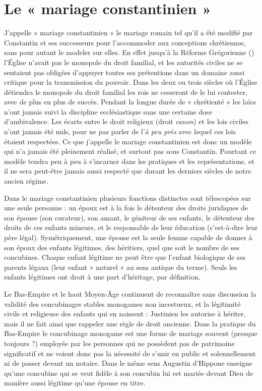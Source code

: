 
\chapter{Le « mariage constantinien »}


 J'appelle « mariage constantinien » le mariage romain tel qu'il a été modifié par Constantin et ses successeurs pour l'accommoder aux conceptions chrétiennes, sans pour autant le modeler sur elles. En effet jusqu'à la Réforme Grégorienne () l'Église n'avait pas le monopole du droit familial, et les autorités civiles ne se sentaient pas obligées d'appuyer toutes ses prétentions dans un domaine aussi critique pour la transmission du pouvoir. Dans les deux ou trois siècles où l'Église détiendra le monopole du droit familial les rois ne cesseront de le lui contester, avec de plus en plus de succès. Pendant la longue durée de « chrétienté » les laïcs n'ont jamais suivi la discipline ecclésiastique sans une certaine dose d'ambivalence. Les écarts entre le droit religieux (droit \emph{canon}) et les lois civiles n'ont jamais été nuls, pour ne pas parler de l'\emph{à peu près} avec lequel ces lois étaient respectées. Ce que j'appelle le mariage constantinien est donc un modèle qui n'a jamais été pleinement réalisé, et surtout pas sous Constantin. Pourtant ce modèle tendra peu à peu à s'incarner dans les pratiques et les représentations, et il ne sera peut-être jamais aussi respecté que durant les derniers siècles de notre ancien régime.

 Dans le mariage constantinien plusieurs fonctions distinctes sont télescopées sur une seule personne : un époux est à la fois le détenteur des droits juridiques de son épouse (son curateur), son amant, le géniteur de ses enfants, le détenteur des droits de ces enfants mineurs, et le responsable de leur éducation (c'est-à-dire leur père légal). Symétriquement, une épouse est la seule femme capable de donner à son époux des enfants légitimes, des héritiers, quel que soit le nombre de ses concubines. Chaque enfant légitime ne peut être que l'enfant biologique de ses parents légaux (leur enfant « naturel » au sens antique du terme). Seuls les enfants légitimes ont droit à une part d'héritage, par définition.

 Le Bas-Empire et le haut Moyen-Âge continuent de reconnaître sans discussion la validité des concubinages stables monogames non incestueux, et la légitimité civile et religieuse des enfants qui en naissent : Justinien les autorise à hériter, mais il ne fait ainsi que rappeler une règle de droit ancienne. Dans la pratique du Bas-Empire le concubinage monogame est une forme de mariage souvent (presque toujours ?) employée par les personnes qui ne possèdent pas de patrimoine significatif et ne voient donc pas la nécessité de s'unir en public et solennellement ni de passer devant un notaire. Dans le même sens Augustin d'Hippone enseigne qu'une concubine qui se veut fidèle à son concubin lui est mariée devant Dieu de manière aussi légitime qu'une épouse en titre.

